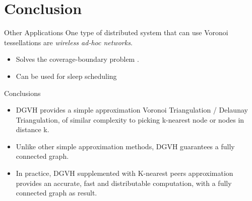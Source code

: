 \documentclass[8pt]{beamer}
\begin{document}
\section{Conclusion}
	\begin{frame}{Other Applications}
		One type of distributed system that can use Voronoi tessellations are \textit{wireless ad-hoc networks}.
		\begin{itemize}
			\item Solves the coverage-boundary problem \cite{carbunar2004distributed}.
			\item Can be used for sleep scheduling \cite{chen2008voronoi}
		\end{itemize}
	\end{frame}	
	
	\begin{frame}{Conclusions}
		\begin{itemize}
			\item DGVH provides a simple approximation Voronoi Triangulation / Delaunay Triangulation, of similar complexity to picking k-nearest node or nodes in distance k.
			\item Unlike other simple approximation methods, DGVH guarantees a fully connected graph.
			\item In practice, DGVH supplemented with K-nearest peers approximation provides an accurate, fast and distributable computation, with a fully connected graph as result.
		\end{itemize}
	\end{frame}		



	
\end{document}
